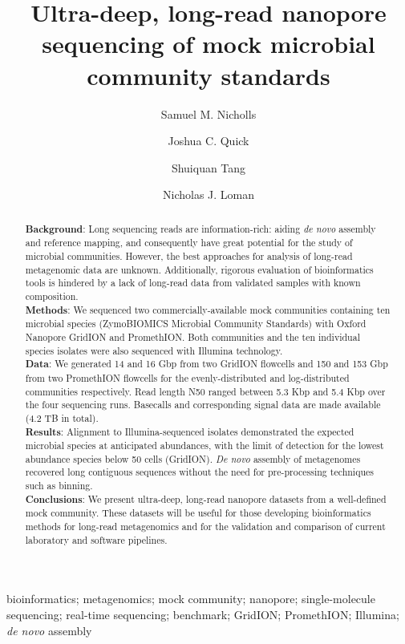 \documentclass[a4paper,num-refs]{oup-contemporary}
\title{Ultra-deep, long-read nanopore sequencing of mock microbial community standards}
\author[1\authfn{2}]{Samuel M. Nicholls}
\author[1\authfn{2}]{Joshua C. Quick}
\author[2]{Shuiquan Tang}
\author[1\authfn{1}]{Nicholas J. Loman}
\affil[1]{Institute of Microbiology and Infection, School of Biosciences, University of Birmingham, UK}
\affil[2]{Zymo Research Corporation, Irvine, California, USA}
\begin{document}
\begin{frontmatter}
\maketitle
\begin{abstract}
\textbf{Background}: 
Long sequencing reads are information-rich: aiding \textit{de novo} assembly and reference mapping, and consequently have great potential for the study of microbial communities. However, the best approaches for analysis of long-read metagenomic data are unknown. Additionally, rigorous evaluation of bioinformatics tools is hindered by a lack of long-read data from validated samples with known composition.  \\
\textbf{Methods}: We sequenced two commercially-available mock communities containing ten microbial species (ZymoBIOMICS Microbial Community Standards) with Oxford Nanopore GridION and PromethION. Both communities and the ten individual species isolates were also sequenced with Illumina technology. \\
\textbf{Data}: We generated 14 and 16 Gbp from two GridION flowcells and 150 and 153 Gbp from two PromethION flowcells for the evenly-distributed and log-distributed communities respectively. Read length N50 ranged between 5.3 Kbp and 5.4 Kbp over the four sequencing runs.
Basecalls and corresponding signal data are made available (4.2 TB in total).
\\
\textbf{Results}: Alignment to Illumina-sequenced isolates demonstrated the expected microbial species at anticipated abundances, with the limit of detection for the lowest abundance species below 50 cells (GridION). \textit{De novo} assembly of metagenomes recovered long contiguous sequences without the need for pre-processing techniques such as binning.
\\
\textbf{Conclusions}: We present ultra-deep, long-read nanopore datasets from a well-defined mock community. These datasets will be useful for those developing bioinformatics methods for long-read metagenomics and for the validation and comparison of current laboratory and software pipelines. 

\end{abstract}
\begin{keywords}
bioinformatics; metagenomics; mock community; nanopore; single-molecule sequencing; real-time sequencing; benchmark; GridION; PromethION; Illumina; \textit{de novo} assembly
\end{keywords}
\end{frontmatter}
\end{document}

